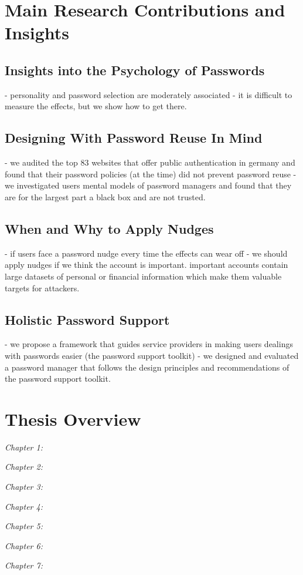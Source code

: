 \section{Main Research Contributions and Insights}
\subsection{Insights into the Psychology of Passwords}
- personality and password selection are moderately associated
- it is difficult to measure the effects, but we show how to get there.

\subsection{Designing With Password Reuse In Mind}
- we audited the top 83 websites that offer public authentication in germany and found that their password policies (at the time) did not prevent password reuse
- we investigated users mental models of password managers and found that they are for the largest part a black box and are not trusted.

\subsection{When and Why to Apply Nudges}
- if users face a password nudge every time the effects can wear off 
- we should apply nudges if we think the account is important. important accounts contain large datasets of personal or financial information which make them valuable targets for attackers.

\subsection{Holistic Password Support}
- we propose a framework that guides service providers in making users dealings with passwords easier (the password support toolkit)
- we designed and evaluated a password manager that follows the design principles and recommendations of the password support toolkit. 

\section{Thesis Overview}
\textit{Chapter 1:}

\textit{Chapter 2:}

\textit{Chapter 3:}

\textit{Chapter 4:}

\textit{Chapter 5:}

\textit{Chapter 6:}

\textit{Chapter 7:}




